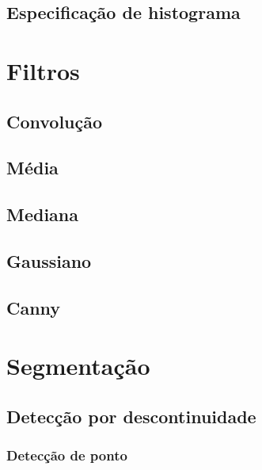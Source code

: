 \documentclass[
  brazilian,
]{book}
\begin{document}
\hypertarget{especificauxe7uxe3o-de-histograma}{%
\section{Especificação de histograma}\label{especificauxe7uxe3o-de-histograma}}

\hypertarget{filtros}{%
\chapter{Filtros}\label{filtros}}

\hypertarget{convoluuxe7uxe3o}{%
\section{Convolução}\label{convoluuxe7uxe3o}}

\hypertarget{muxe9dia}{%
\section{Média}\label{muxe9dia}}

\hypertarget{mediana}{%
\section{Mediana}\label{mediana}}

\hypertarget{gaussiano}{%
\section{Gaussiano}\label{gaussiano}}

\hypertarget{canny}{%
\section{Canny}\label{canny}}

\hypertarget{segmentauxe7uxe3o}{%
\chapter{Segmentação}\label{segmentauxe7uxe3o}}

\hypertarget{detecuxe7uxe3o-por-descontinuidade}{%
\section{Detecção por descontinuidade}\label{detecuxe7uxe3o-por-descontinuidade}}

\hypertarget{detecuxe7uxe3o-de-ponto}{%
\subsection{Detecção de ponto}\label{detecuxe7uxe3o-de-ponto}}
\end{document}
